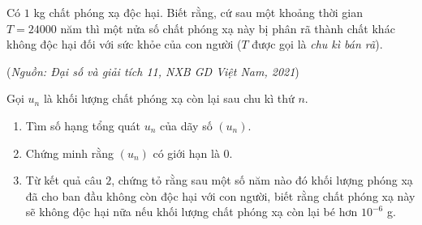 \begin{vd}%
	Có $1$ kg chất phóng xạ độc hại. Biết rằng, cứ sau một khoảng thời gian $T=24000$ năm thì một nửa số chất phóng xạ này bị phân rã thành chất khác không độc hại đối với sức khỏe của con người ($T$ được gọi là \textit{chu kì bán rã}).
	\begin{flushright}
		(\textit{Nguồn: Đại số và giải tích 11, NXB GD Việt Nam, 2021})
	\end{flushright}
	Gọi $u_n$ là khối lượng chất phóng xạ còn lại sau chu kì thứ $n$.
	\begin{enumerate}
		\item  Tìm số hạng tổng quát $u_n$ của dãy số $(u_n)$.
		\item  Chứng minh rằng $(u_n)$ có giới hạn là $0$.
		\item  Từ kết quả câu $2$, chứng tỏ rằng sau một số năm nào đó khối lượng phóng xạ đã cho ban đầu không còn độc hại với con người, biết rằng chất phóng xạ này sẽ không độc hại nữa nếu khối lượng chất phóng xạ còn lại bé hơn $10^{-6}$ g.
	\end{enumerate}
\end{vd}

